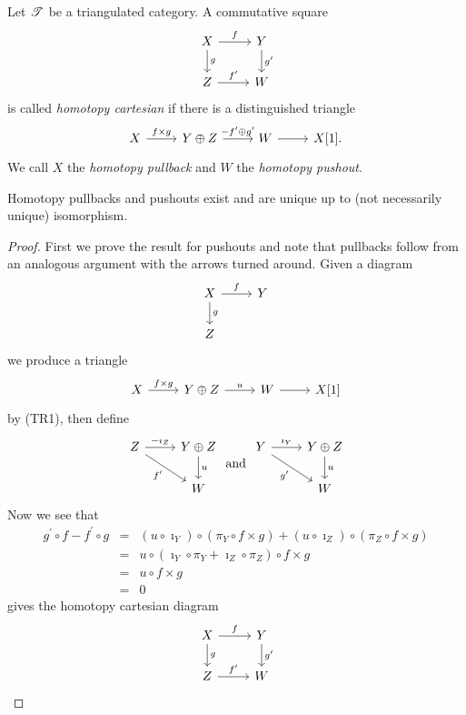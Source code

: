 \documentclass[dissertation.tex]{subfiles}
\begin{document}
\begin{defn}
  Let $\mathscr{T}$ be a triangulated category.
  A commutative square
  $$\begin{tikzcd}
    X \arrow{r}{f}\arrow{d}{g} & Y\arrow{d}{g^\prime}\\
    Z \arrow{r}{f^\prime} & W
  \end{tikzcd}$$
  is called {\it homotopy cartesian} if there is a distinguished triangle
  $$\begin{tikzcd}
    X \arrow{r}{f \times g} & Y \oplus Z \arrow{r}{-f^\prime \oplus g^\prime} & W \arrow{r} & X[1].
  \end{tikzcd}$$
  We call $X$ the {\it homotopy pullback} and $W$ the {\it homotopy pushout}.
\end{defn}

\begin{prop}
  Homotopy pullbacks and pushouts exist and are unique up to (not necessarily unique) isomorphism.
  
  \begin{proof}
    First we prove the result for pushouts and note that pullbacks follow from an analogous argument with the arrows turned around.
    Given a diagram
    $$\begin{tikzcd}
      X \arrow{r}{f}\arrow{d}{g} & Y\\
      Z
    \end{tikzcd}$$
    we produce a triangle 
    $$\begin{tikzcd}
      X \arrow{r}{f \times g} & Y \oplus Z \arrow{r}{u} & W \arrow{r} & X[1]
    \end{tikzcd}$$
    by (TR1), then define
    $$\begin{tikzcd}
      Z \arrow{r}{-\imath_Z}\arrow[swap]{rd}{f^\prime} & Y \oplus Z\arrow{d}{u}\\
      & W
    \end{tikzcd}
    \ \text{and}\ 
    \begin{tikzcd}
      Y \arrow{r}{\imath_Y}\arrow[swap]{rd}{g^\prime} & Y \oplus Z\arrow{d}{u}\\
      & W
    \end{tikzcd}$$
    Now we see that
    \begin{eqnarray*}
      g^\prime \circ f - f^\prime \circ g &=& (u \circ \imath_Y) \circ (\pi_Y \circ f \times g) + (u \circ \imath_Z) \circ (\pi_Z \circ f \times g)\\
      &=& u \circ (\imath_Y \circ \pi_Y + \imath_Z \circ \pi_Z) \circ f \times g\\
      &=& u \circ f \times g\\
      &=& 0
    \end{eqnarray*}
    gives the homotopy cartesian diagram
    $$\begin{tikzcd}
      X \arrow{r}{f}\arrow{d}{g} & Y\arrow{d}{g^\prime}\\
      Z \arrow{r}{f^\prime} & W
    \end{tikzcd}$$
    

\end{proof}
\end{prop}
\end{document}
